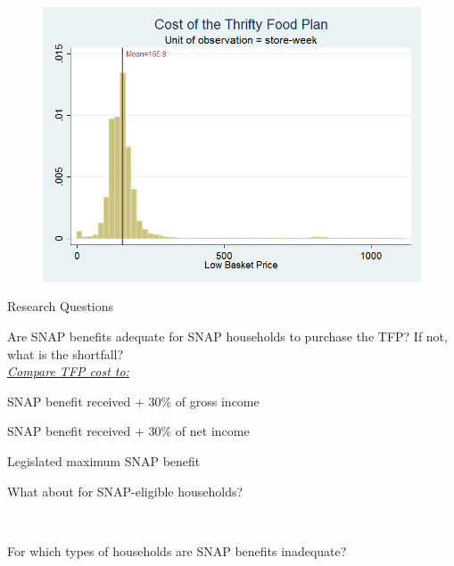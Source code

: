 \documentclass{beamer}
\begin{document}
\begin{frame}
\begin{figure}
{\includegraphics[scale=.4, trim=0cm .0cm 0cm 0cm, clip=true]{./images/low_basket_price_histo.png}}
\end{figure}
\end{frame}


\begin{frame}{Research Questions}
\begin{enumerate}
\item \large{Are SNAP benefits adequate for SNAP households to purchase the TFP? If not, what is the shortfall?}\\
\vskip6pt \hspace{2mm} \normalsize{\underline{\textit{Compare TFP cost to:}}}
\begin{itemize}
{\item SNAP benefit received + 30\% of gross income} 
{\item SNAP benefit received + 30\% of net income} 
{\item Legislated maximum SNAP benefit} 
\end{itemize}
{\item \vskip12pt \large{What about for SNAP-eligible households?}}\\
{\item \vskip12pt \large{For which types of households are SNAP benefits inadequate?}}
\end{enumerate}
\end{frame}
\end{document}
